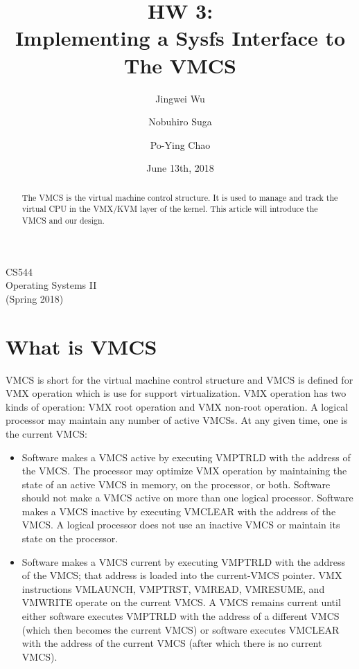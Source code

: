\documentclass[10pt,draftclsnofoot,journal,compsoc,onecolumn]{IEEEtran}
\title{HW 3: \\
	Implementing a Sysfs Interface to The VMCS}
\author{
	Jingwei Wu \hspace{1cm}
	\and
	Nobuhiro Suga \hspace{1cm}
	\and
	Po-Ying Chao
}
\date{June 13th, 2018}
\begin{document}
	\begin{titlepage} 
		\maketitle
		\begin{center}
			CS544\\
			Operating Systems II\\
			(Spring 2018)
			\vspace{50 mm}
		\end{center}
		
		\begin{abstract}
			The VMCS is the virtual machine control structure. It is used to manage and track the virtual CPU in the VMX/KVM layer of the kernel. This article will introduce the VMCS and our design.
		\end{abstract}
	\end{titlepage}
	
	\section{What is VMCS}
	VMCS is short for the virtual machine control structure and VMCS is defined for VMX operation which is use for support virtualization. \cite{2}VMX operation has two kinds of operation: VMX root operation and VMX non-root operation. A logical processor may maintain any number of active VMCSs. At any given time, one is the current VMCS:
	
	\begin{itemize}
		\item Software makes a VMCS active by executing VMPTRLD with the address of the VMCS. The processor may optimize VMX operation by maintaining the state of an active VMCS in memory, on the processor, or both. Software should not make a VMCS active on more than one logical processor. Software makes a VMCS inactive by executing VMCLEAR with the address of the VMCS. A logical processor does not use an inactive VMCS or maintain its state on the processor. 
		\item Software makes a VMCS current by executing VMPTRLD with the address of the VMCS; that address is loaded into the current-VMCS pointer. VMX instructions VMLAUNCH, VMPTRST, VMREAD, VMRESUME, and VMWRITE operate on the current VMCS. A VMCS remains current
		until either software executes VMPTRLD with the address of a different VMCS (which then becomes the current VMCS) or software executes VMCLEAR with the address of the current VMCS (after which there is no current VMCS).
	\end{itemize}
	
\end{document}
